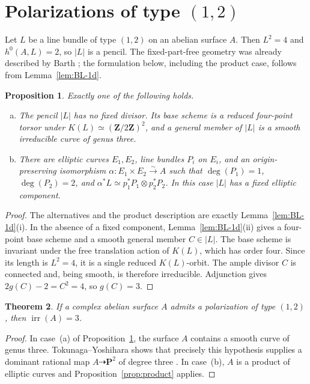 \documentclass[12pt]{amsart}
\numberwithin{equation}{section}
\newtheorem{theorem}{Theorem}[section]
\newtheorem{proposition}[theorem]{Proposition}
\theoremstyle{definition}
\theoremstyle{remark}
\newcommand{\Z}{\mathbf Z}
\newcommand{\PP}{\mathbf P}
\newcommand{\irr}{\operatorname{irr}}
\begin{document}
\section{Polarizations of type \texorpdfstring{$(1,2)$}{(1,2)}}
\label{sec:12}

Let $L$ be a line bundle of type $(1,2)$ on an abelian surface $A$.
Then $L^2=4$ and $h^0(A,L)=2$, so $|L|$ is a pencil.
The fixed-part-free geometry was already described by Barth
\cite{Barth}; the formulation below, including
the product case, follows from Lemma~\ref{lem:BL-1d}.

\begin{proposition}\label{prop:12-dichotomy}
Exactly one of the following holds.
\begin{enumerate}[(a)]
\item The pencil $|L|$ has no fixed divisor.  Its base scheme is a reduced
      four-point torsor under $K(L)\simeq(\Z/2\Z)^2$,
      and a general member of $|L|$ is a smooth irreducible curve of genus
      three.
\item There are elliptic curves $E_1,E_2$, line bundles $P_i$ on $E_i$,
      and an origin-preserving isomorphism
      $\alpha:E_1\times E_2\xrightarrow{\sim}A$ such that
      $\deg(P_1)=1$, $\deg(P_2)=2$, and
      $\alpha^*L\simeq p_1^*P_1\otimes p_2^*P_2$.
      In this case $|L|$ has a fixed elliptic component.
\end{enumerate}
\end{proposition}

\begin{proof}
The alternatives and the product description are exactly
Lemma~\ref{lem:BL-1d}(i).  In the absence of a fixed component,
Lemma~\ref{lem:BL-1d}(ii) gives a four-point base scheme and a smooth
general member $C\in|L|$.  The base scheme is invariant under the free
translation action of $K(L)$, which has order four.  Since its length is
$L^2=4$, it is a single reduced $K(L)$-orbit.  The ample divisor $C$ is
connected and, being smooth, is therefore irreducible.  Adjunction gives
$2g(C)-2=C^2=4$, so $g(C)=3$.
\end{proof}

\begin{theorem}\label{thm:type12}
If a complex abelian surface $A$ admits a polarization of type $(1,2)$,
then $\irr(A)=3$.
\end{theorem}

\begin{proof}
In case~(a) of Proposition~\ref{prop:12-dichotomy}, the surface $A$
contains a smooth curve of genus three.  Tokunaga--Yoshihara shows that precisely
this hypothesis supplies a dominant rational map
$A\dashrightarrow\PP^2$ of degree three
\cite{TokunagaYoshihara, YoshiharaProduct}.  In case~(b),
$A$ is a product of elliptic curves and Proposition~\ref{prop:product}
applies.  
\end{proof}
\end{document}
